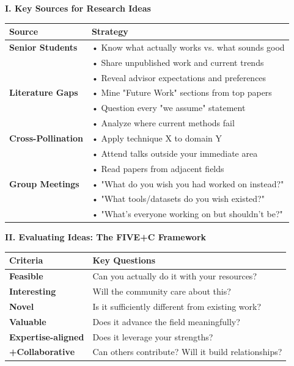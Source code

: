 \documentclass[11pt,a4paper]{article}
\begin{document}
\textbf{I. Key Sources for Research Ideas}

\begin{table}[H]
\centering
\small
\begin{tabular}{@{}p{3.5cm}p{9cm}@{}}
\toprule
\textbf{Source} & \textbf{Strategy} \\
\midrule
\textbf{Senior Students} & • Know what actually works vs. what sounds good\\
& • Share unpublished work and current trends\\
& • Reveal advisor expectations and preferences\\
\midrule
\textbf{Literature Gaps} & • Mine "Future Work" sections from top papers\\
& • Question every "we assume" statement\\
& • Analyze where current methods fail\\
\midrule
\textbf{Cross-Pollination} & • Apply technique X to domain Y\\
& • Attend talks outside your immediate area\\
& • Read papers from adjacent fields\\
\midrule
\textbf{Group Meetings} & • "What do you wish you had worked on instead?"\\
& • "What tools/datasets do you wish existed?"\\
& • "What's everyone working on but shouldn't be?"\\
\bottomrule
\end{tabular}
\end{table}

\textbf{II. Evaluating Ideas: The FIVE+C Framework}

\begin{table}[H]
\centering
\small
\begin{tabular}{@{}p{3cm}p{9.5cm}@{}}
\toprule
\textbf{Criteria} & \textbf{Key Questions} \\
\midrule
\textbf{Feasible} & Can you actually do it with your resources? \\
\textbf{Interesting} & Will the community care about this? \\
\textbf{Novel} & Is it sufficiently different from existing work? \\
\textbf{Valuable} & Does it advance the field meaningfully? \\
\textbf{Expertise-aligned} & Does it leverage your strengths? \\
\textbf{+Collaborative} & Can others contribute? Will it build relationships? \\
\bottomrule
\end{tabular}
\end{table}
\end{document}
